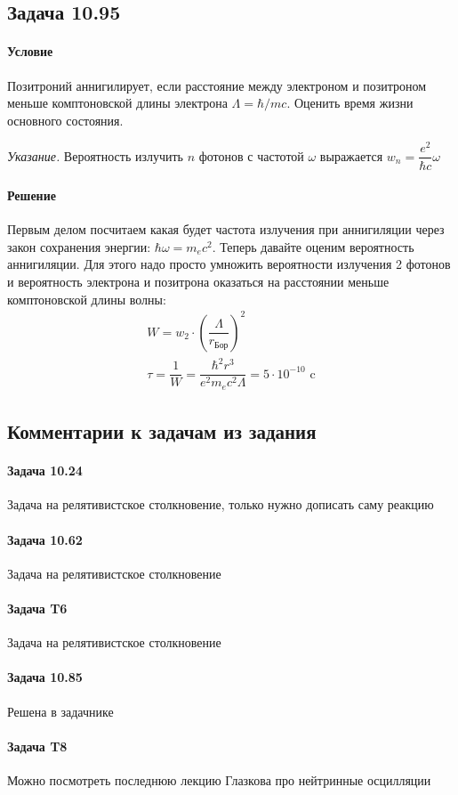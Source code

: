 \documentclass[12pt]{article}
\begin{document}
\subsection{Задача 10.95}
\label{task_}
\paragraph{Условие}
Позитроний аннигилирует, если расстояние между электроном и позитроном меньше комптоновской длины электрона $\Lambda = \hbar/mc$. Оценить время жизни основного состояния.

\textit{Указание.} Вероятность излучить $n$ фотонов с частотой $\omega$ выражается $w_n = \dfrac{e^2}{\hbar c} \omega$
\paragraph{Решение}
Первым делом посчитаем какая будет частота излучения при аннигиляции через закон сохранения энергии: $\hbar \omega = m_ec^2$. Теперь давайте оценим вероятность аннигиляции. Для этого надо просто умножить вероятности излучения 2 фотонов и вероятность электрона и позитрона оказаться на расстоянии меньше комптоновской длины волны:
\begin{gather*}
    W = w_2 \cdot \left(\dfrac{\Lambda}{r_{\text{Бор}}}\right)^2\\
    \tau = \dfrac{1}{W} = \dfrac{\hbar^2 r^3}{e^2 m_ec^2 \Lambda} = 5\cdot 10^{-10} \text{ c}
\end{gather*}


\subsection{Комментарии к задачам из задания}
\paragraph{Задача 10.24} Задача на релятивистское столкновение, только нужно дописать саму реакцию
\paragraph{Задача 10.62}  Задача на релятивистское столкновение
\paragraph{Задача T6} Задача на релятивистское столкновение
\paragraph{Задача 10.85} Решена в задачнике
\paragraph{Задача T8} Можно посмотреть последнюю лекцию Глазкова про нейтринные осцилляции
\end{document}
